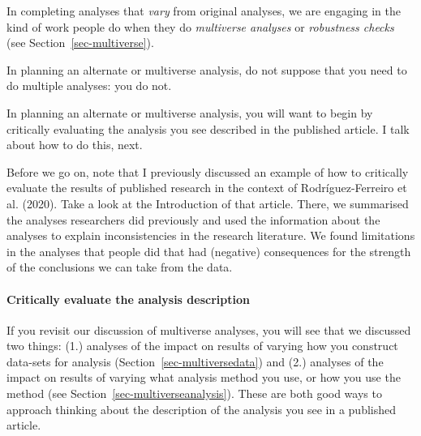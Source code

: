 \documentclass[
  letterpaper,
  DIV=11,
  numbers=noendperiod]{scrreprt}
\let\oldparagraph\paragraph
\renewcommand{\paragraph}[1]{\oldparagraph{#1}\mbox{}}
\begin{document}
In completing analyses that \emph{vary} from original analyses, we are
engaging in the kind of work people do when they do \emph{multiverse
analyses} or \emph{robustness checks} (see
Section~\ref{sec-multiverse}).

\begin{tcolorbox}[enhanced jigsaw, opacitybacktitle=0.6, title=\textcolor{quarto-callout-tip-color}{\faLightbulb}\hspace{0.5em}{Tip}, arc=.35mm, colbacktitle=quarto-callout-tip-color!10!white, colframe=quarto-callout-tip-color-frame, leftrule=.75mm, opacityback=0, breakable, titlerule=0mm, left=2mm, bottomrule=.15mm, toprule=.15mm, colback=white, coltitle=black, bottomtitle=1mm, toptitle=1mm, rightrule=.15mm]

In planning an alternate or multiverse analysis, do not suppose that you
need to do multiple analyses: you do not.

\end{tcolorbox}

In planning an alternate or multiverse analysis, you will want to begin
by critically evaluating the analysis you see described in the published
article. I talk about how to do this, next.

Before we go on, note that I previously discussed an example of how to
critically evaluate the results of published research in the context of
Rodríguez-Ferreiro et al. (2020). Take a look at the Introduction of
that article. There, we summarised the analyses researchers did
previously and used the information about the analyses to explain
inconsistencies in the research literature. We found limitations in the
analyses that people did that had (negative) consequences for the
strength of the conclusions we can take from the data.

\hypertarget{sec-critical-evaluation}{%
\paragraph{Critically evaluate the analysis
description}\label{sec-critical-evaluation}}

If you revisit our discussion of multiverse analyses, you will see that
we discussed two things: (1.) analyses of the impact on results of
varying how you construct data-sets for analysis
(Section~\ref{sec-multiversedata}) and (2.) analyses of the impact on
results of varying what analysis method you use, or how you use the
method (see Section~\ref{sec-multiverseanalysis}). These are both good
ways to approach thinking about the description of the analysis you see
in a published article.
\end{document}
